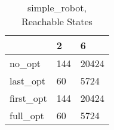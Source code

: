 \begin{table}
\caption{simple\_robot, Reachable States}
\label{simple_robot_reach}
\begin{tabular}{lll}
\toprule
 & 2 & 6 \\
\midrule
no\_opt & 144 & 20424 \\
last\_opt & 60 & 5724 \\
first\_opt & 144 & 20424 \\
full\_opt & 60 & 5724 \\
\bottomrule
\end{tabular}
\end{table}
